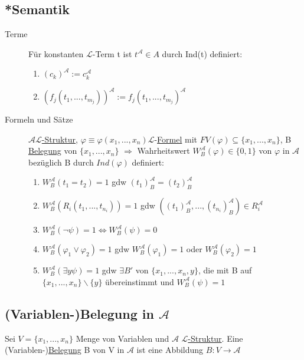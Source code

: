 \documentclass[12pt,a4paper]{article} %
\begin{document}
	\subsection{*Semantik}
	\begin{description}
		\item[Terme] Für konstanten $\mathcal{L}$-Term t ist $t^{\mathcal{A}} \in A$ durch Ind(t) definiert:
		\begin{enumerate}
			\item $(c_k)^{\mathcal{A}} := c_k^{\mathcal{A}}$
			\item $(f_j(t_1, ..., t_{m_j}))^{\mathcal{A}} := f_j(t_1, ..., t_{m_j})^{\mathcal{A}}$
		\end{enumerate}
		\item[Formeln und Sätze] \hyperref[Struktur]{$\mathcal{A} \mathcal{L}$-Struktur}, $\varphi \equiv \varphi(x_1, ..., x_n) \mathcal{L}$-\hyperref[Formel]{Formel} mit $FV(\varphi) \subseteq \{x_1, ..., x_n\}$, B \hyperref[Belegung]{Belegung} von $\{x_1, ..., x_n\}$ \newline
		$\Rightarrow$ Wahrheitswert $W_B^{\mathcal{A}}(\varphi) \in \{0, 1\}$ von $\varphi$ in $\mathcal{A}$ bezüglich B durch $Ind(\varphi)$ definiert:
		\begin{enumerate}
			\item $W_B^{\mathcal{A}}(t_1 = t_2) = 1$ gdw $(t_1)_B^{\mathcal{A}} = (t_2)_B^{\mathcal{A}}$
			\item $W_B^{\mathcal{A}}(R_i(t_1, ..., t_{n_i})) = 1$ gdw $((t_1)_B^{\mathcal{A}}, ..., (t_{n_i})_B^{\mathcal{A}}) \in R_i^{\mathcal{A}}$
			\item $W_B^{\mathcal{A}}(\neg \psi) = 1 \Leftrightarrow W_B^{\mathcal{A}}(\psi) = 0$
			\item $W_B^{\mathcal{A}}(\varphi_1 \lor \varphi_2) = 1$ gdw $W_B^{\mathcal{A}}(\varphi_1) = 1$ oder $W_B^{\mathcal{A}}(\varphi_2) = 1$
			\item $W_B^{\mathcal{A}}(\exists y \psi) = 1$ gdw $\exists B'$ von $\{x_1, ..., x_n, y\}$, die mit B auf $\{x_1, ..., x_n\} \backslash \{y\}$ übereinstimmt und $W_B^{\mathcal{A}}(\psi) = 1$
		\end{enumerate}
	\end{description}
	
	\subsection{(Variablen-)Belegung in $\mathcal{A}$}
	Sei $V = \{x_1, ..., x_n\}$ Menge von Variablen und $\mathcal{A}$ \hyperref[Struktur]{$\mathcal{L}$-Struktur}. \newline
	Eine (Variablen-)\hyperref[Belegung]{Belegung} B von V in $\mathcal{A}$ ist eine Abbildung $B: V \rightarrow \mathcal{A}$ 
	
\end{document}
